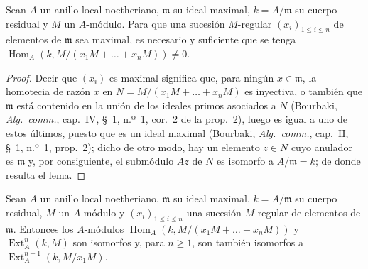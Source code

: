 \begin{lemma}[16.4.2]
\label{0.16.4.2-fr}
Sean $A$ un anillo local noetheriano, $\mathfrak{m}$ su ideal maximal,
$k=A/\mathfrak{m}$ su cuerpo residual y $M$ un $A$-módulo. Para que una
sucesión $M$-regular $(x_i)_{1\leq i\leq n}$ de elementos de $\mathfrak{m}$
sea maximal, es necesario y suficiente que se tenga
$\operatorname{Hom}_A(k,M/(x_1M+\ldots+x_nM))\neq0$.
\end{lemma}

\begin{proof}
Decir que $(x_i)$ es maximal significa que, para ningún $x\in\mathfrak{m}$,
la homotecia de razón $x$ en $N=M/(x_1M+\ldots+x_nM)$ es inyectiva, o también
que $\mathfrak{m}$ está contenido en la unión de los ideales primos asociados
a $N$ (Bourbaki, \emph{Alg.~comm.}, cap.~IV, \S~1, n.º~1, cor.~2 de la
prop.~2), luego es igual a uno de estos últimos, puesto que es un ideal
maximal (Bourbaki, \emph{Alg.~comm.}, cap.~II, \S~1, n.º~1, prop.~2); dicho de
otro modo, hay un elemento $z\in N$ cuyo anulador es $\mathfrak{m}$ y, por
consiguiente, el submódulo $Az$ de $N$ es isomorfo a
$A/\mathfrak{m}=k$; de donde resulta el lema.
\end{proof}

\begin{lemma}[16.4.3]
\label{0.16.4.3-fr}
Sean $A$ un anillo local noetheriano, $\mathfrak{m}$ su ideal maximal,
$k=A/\mathfrak{m}$ su cuerpo residual, $M$ un $A$-módulo y
$(x_i)_{1\leq i\leq n}$ una sucesión $M$-regular de elementos de
$\mathfrak{m}$. Entonces los $A$-módulos
$\operatorname{Hom}_A(k,M/(x_1M+\ldots+x_nM))$ y $\operatorname{Ext}^n_A(k,M)$
son isomorfos y, para $n\geq1$, son también isomorfos a
$\operatorname{Ext}^{n-1}_A(k,M/x_1M)$.
\end{lemma}


